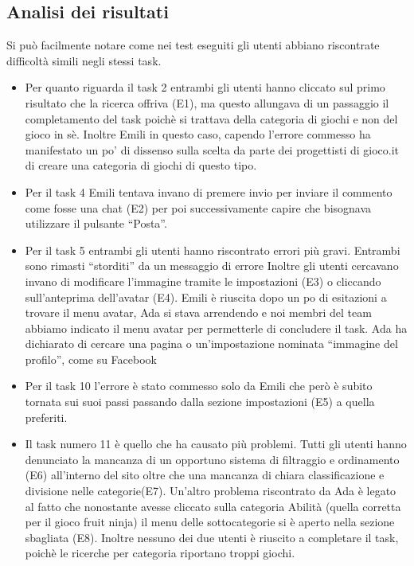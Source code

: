 \documentclass[../Report.tex]{subfiles}
\begin{document}
    \subsection{Analisi dei risultati}
    Si può facilmente notare come nei test eseguiti gli utenti abbiano riscontrate difficoltà simili negli stessi task. 
    \begin{itemize}
        \item Per quanto riguarda il task 2 entrambi gli utenti hanno cliccato sul primo risultato che la ricerca offriva (E1), ma questo allungava di un passaggio il completamento del task poichè si trattava della categoria di giochi e non del gioco in sè. Inoltre Emili in questo caso, capendo l’errore commesso ha manifestato un po’ di dissenso sulla scelta da parte dei progettisti di gioco.it di creare una categoria di giochi di questo tipo. 
        \item Per il task 4 Emili tentava invano di premere invio per inviare il commento come fosse una chat (E2) per poi successivamente capire che bisognava utilizzare il pulsante “Posta”. 
        \item Per il task 5 entrambi gli utenti hanno riscontrato errori più gravi. Entrambi sono rimasti “storditi” da un messaggio di errore 
        Inoltre gli utenti cercavano invano di modificare l’immagine tramite le impostazioni (E3) o cliccando sull’anteprima dell’avatar (E4). Emili è riuscita dopo un po di esitazioni a trovare il menu avatar, Ada si stava arrendendo e noi membri del team abbiamo indicato il menu avatar per permetterle di concludere il task. Ada ha dichiarato di cercare una pagina o un’impostazione nominata “immagine del profilo”, come su Facebook
        \item Per il task 10 l’errore è stato commesso solo da Emili che però è subito tornata sui suoi passi passando dalla sezione impostazioni (E5) a quella preferiti.
        \item Il task numero 11 è quello che ha causato più problemi. Tutti gli utenti hanno denunciato la mancanza di un opportuno sistema di filtraggio e ordinamento (E6) all’interno del sito oltre che una mancanza di chiara  classificazione e divisione nelle categorie(E7). Un’altro problema riscontrato da Ada è legato al fatto che nonostante avesse cliccato sulla categoria Abilità (quella corretta per il gioco fruit ninja) il menu delle sottocategorie si è aperto nella sezione sbagliata (E8). Inoltre nessuno dei due utenti è riuscito a completare il task, poichè le ricerche per categoria riportano troppi giochi.       
    \end{itemize}
    
\end{document}
